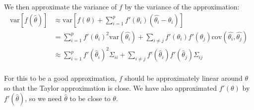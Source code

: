 \documentclass{article}
\begin{document}
We then approximate the variance of \(f\) by the variance of the approximation:
\begin{align*}
\mbox{var}[f(\hat{\theta})] &\approx \mbox{var}[ f(\theta) + \sum_{i=1}^p f'(\theta_i) (\hat{\theta_i} - \theta_i)]\\
&= \sum_{i=1}^p f'(\theta_i)^2 \mbox{var}(\hat{\theta_i}) + \sum_{i\neq j} f'(\theta_i) f'(\theta_j) \mbox{cov}(\hat{\theta_i}, \hat{\theta_j})\\
&\approx \sum_{i=1}^p f'(\hat{\theta}_i)^2 \Sigma_{ii} + \sum_{i\neq j} f'(\hat{\theta}_i) f'(\hat{\theta}_j) \Sigma_{ij}\\
\end{align*}

For this to be a good approximation, \(f\) should be approximately linear around \(\theta\) so that the Taylor approximation is close. We have also approximated \(f'(\theta)\) by \(f'(\hat{\theta})\), so we need \(\hat{\theta}\) to be close to \(\theta\).
\end{document}
